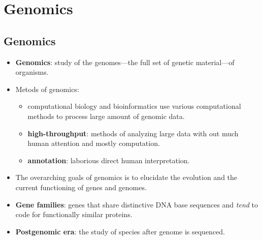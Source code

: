 \documentclass[12pt,a4paper]{article}
\begin{document}
\clearpage
{}
\clearpage
\section{Genomics}
\subsection{Genomics}
\begin{itemize}
    \item \textbf{Genomics}: study of the genomes---the full set of genetic material---of organisms.
    \item Metods of genomics:
        \begin{itemize}
            \item computational biology and bioinformatics use various computational methods to process large amount of genomic data.
            \item \textbf{high-throughput}: methods of analyzing large data with out much human attention and mostly computation.
            \item \textbf{annotation}: laborious direct human interpretation.
        \end{itemize}
    \item The {\color{o-Sun}overarching goals} of genomics is to elucidate the {\color{o-Sun}evolution} and the {\color{o-Sun}current functioning} of genes and genomes.
    \item \textbf{Gene families}: genes that share distinctive DNA base sequences and \textit{tend} to code for functionally similar proteins.
    \item \textbf{Postgenomic era}: the study of species after genome is sequenced.
\end{itemize}
\end{document}
